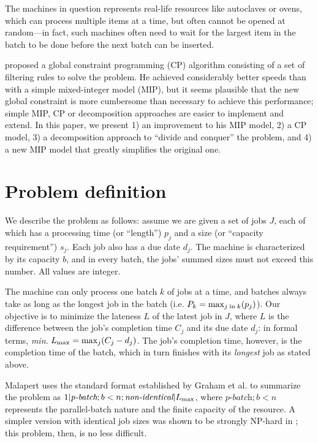 \documentclass[13pt, letterpaper, oneside]{book}
\begin{document}
The machines in question represents real-life resources like autoclaves or
ovens, which can process multiple items at a time, but often cannot be opened at
random---in fact, such machines often need to wait for the largest item in the
batch to be done before the next batch can be inserted.

\citet{Malapert} proposed a global constraint programming (CP) algorithm consisting
of a set of filtering rules to solve the problem. He achieved considerably
better speeds than with a simple mixed-integer model (MIP), but it seems plausible
that the new global constraint is more cumbersome than necessary to achieve this
performance; simple MIP, CP or decomposition approaches are easier to implement
and extend.  In this paper, we present 1) an improvement to his MIP model, 2) a
CP model, 3) a decomposition approach to ``divide and conquer'' the problem, and
4) a new MIP model that greatly simplifies the original one.

\section{Problem definition}
We describe the problem as follows: assume we are given a set of jobs $J$, each of
which has a processing time (or ``length'') $p_j$ and a size (or ``capacity
requirement'') $s_j$. Each job also
has a due date $d_j$. The machine is characterized by its capacity $b$, and in
every batch, the jobs' summed sizes must not exceed this number. All values are
integer.

The machine can only process one batch $k$ of jobs at a time, and batches always
take as long as the longest job in the batch (i.e. $P_k = \max_{j \text{\;in\;} k}(p_j)$).
Our objective is to minimize the lateness $L$ of the latest job in $J$, where
$L$ is the difference between the job's completion time $C_j$ and its due date
$d_j$: in formal terms, \textit{min.} $L_{\text{max}} = \max_j(C_j - d_j)$. The job's
completion time, however, is the completion time of the batch, which in turn
finishes with its \textit{longest} job as stated above.

Malapert uses the standard format established by Graham et al. to
summarize the problem as $1|\textit{p-batch}; b < n;
\textit{non-identical}|L_{\text{max}}$, where $\textit{p-batch};b<n$ represents the
parallel-batch nature and the finite capacity of the resource. A simpler version
with identical job sizes was shown to be strongly NP-hard in \citep{Brucker};
this problem, then, is no less difficult.
\end{document}
